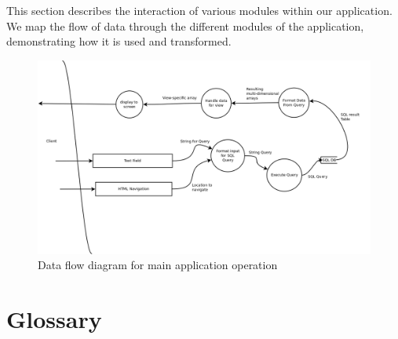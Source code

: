 \documentclass[11pt]{article}
\begin{document}
This section describes the interaction of various modules within our application. We map the flow of data through the different
modules of the application, demonstrating how it is used and transformed.

\begin{figure}[h]
  \centering
  \includegraphics[width=1\textwidth,scale=1.5]{diagrams/dataflow.png}
  \caption{Data flow diagram for main application operation}
\end{figure}

\pagebreak[4]

\section{Glossary} \label{sec:glossary}


\end{document}
